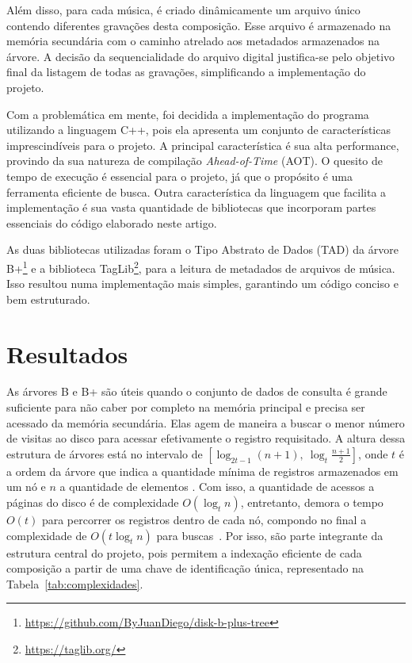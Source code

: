 \documentclass[12pt]{article}
\begin{document}
Além disso, para cada música, é criado dinâmicamente um arquivo único contendo diferentes gravações 
desta composição. Esse arquivo é armazenado na memória secundária com o caminho
atrelado aos metadados armazenados na árvore. A decisão da sequencialidade do
arquivo digital justifica-se pelo objetivo final da listagem de todas as
gravações, simplificando a implementação do projeto.

Com a problemática em mente, foi decidida a implementação do programa utilizando
a linguagem C++, pois ela apresenta um conjunto de características
imprescindíveis para o projeto. A principal característica é sua alta
performance, provindo da sua natureza de compilação \emph{Ahead-of-Time} (AOT).
O quesito de tempo de execução é essencial para o projeto, já que o propósito é
uma ferramenta eficiente de busca. Outra característica da linguagem que
facilita a implementação é sua vasta quantidade de bibliotecas que incorporam
partes essenciais do código elaborado neste artigo.

As duas bibliotecas utilizadas foram o Tipo Abstrato de Dados (TAD) da árvore
B+\footnote{\url{https://github.com/ByJuanDiego/disk-b-plus-tree}} e a
biblioteca TagLib\footnote{\url{https://taglib.org/}}, para a leitura de
metadados de arquivos de música. Isso resultou numa implementação mais simples,
garantindo um código conciso e bem estruturado.

\section{Resultados} \label{sec:results}
As árvores B e B\nolinebreak+ são úteis quando o conjunto de dados de consulta é
grande suficiente para não caber por completo na memória principal e precisa ser
acessado da memória secundária. Elas agem de maneira a buscar o menor número de
visitas ao disco para acessar efetivamente o registro requisitado. A altura
dessa estrutura de árvores está no intervalo de $[\log_{2t-1} (n+1),\ \log_t
\frac{n + 1}{2}]$, onde $t$ é a ordem da árvore que indica a quantidade mínima
de registros armazenados em um nó e $n$ a quantidade de elementos
\cite{clrs:22}. Com isso, a quantidade de acessos a páginas do disco é de
complexidade $O(\log_t n)$, entretanto, demora o tempo $O(t)$ para percorrer os
registros dentro de cada nó, compondo no final a complexidade de $O(t \log_t n)$
para buscas~\cite{clrs:22,Pm:10}. Por isso, são parte integrante da estrutura
central do projeto, pois permitem a indexação eficiente de cada composição a
partir de uma chave de identificação única, representado na
Tabela~\ref{tab:complexidades}.
\end{document}
